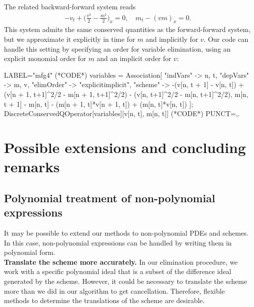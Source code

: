 \documentclass[runningheads]{llncs}
\newcommand{\1}{\chi}
\begin{document}
\begin{example}
	The related backward-forward system reads
	\begin{gather*}
		-v_t+\Big(\frac{v^2}{2}-\frac{m^2}{2}\Big)_x=0,\quad
		m_t-(vm)_x=0.
	\end{gather*}
	This system admits the same conserved quantities as the forward-forward system, but we approximate it explicitly in time for $m$ and implicitly for $v$.
	Our code can handle this setting by specifying an order for variable elimination, using an explicit monomial order for $m$ and an implicit order for $v$:
	\begin{EXE}
		LABEL="mfg4"
		(*CODE*)
		variables = Association[
		"indVars" -> {n, t},
		"depVars" -> {m, v},
		"elimOrder" -> "explicitimplicit",
		"scheme" -> {-(v[n, t + 1] - 
			v[n, t]) + (v[n + 1, t+1]^2/2 - m[n + 1, t+1]^2/2) - (v[n, t+1]^2/2 - 
			m[n, t+1]^2/2), 
			m[n, t + 1] - 
			m[n, t] - (m[n + 1, t]*v[n + 1, t]) + (m[n, t]*v[n, t])}
		];
		DiscreteConservedQOperator[variables][{v[n, t], m[n, t]}]
		(*CODE*)
		PUNCT={,.}
	\end{EXE}
	\begin{small}
		
		
	\end{small}
\end{example}
\section{Possible extensions and concluding remarks}
\subsection{ Polynomial treatment of non-polynomial expressions}
It may be possible to extend our methods to non-polynomial PDEs and schemes. In this case, non-polynomial expressions can be handled by writing them in polynomial form.\\
{\bf Translate the scheme more accurately.}
In our elimination procedure, we work with a specific polynomial ideal that is a subset of the difference ideal generated by the scheme. However, it could be necessary to translate the scheme more than we did in our algorithm to get cancellation. Therefore, flexible methods to determine the translations of the scheme are desirable.\\
\end{document}
